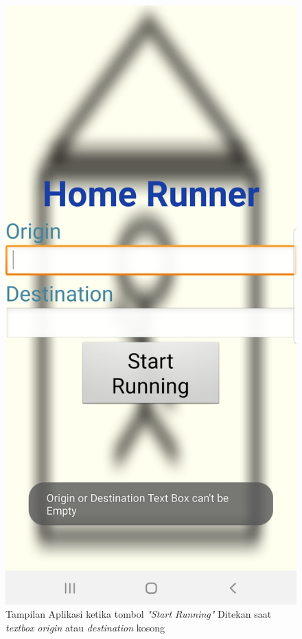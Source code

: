 \begin{figure}
\centering
\includegraphics[scale=0.15]{Gambar/empty-textbox.jpg}
    \caption{Tampilan Aplikasi ketika tombol \textit{"Start Running"} Ditekan saat \textit{textbox} \textit{origin} atau \textit{destination} kosong}
    \label{fig:empty-textbox}
\end{figure}


